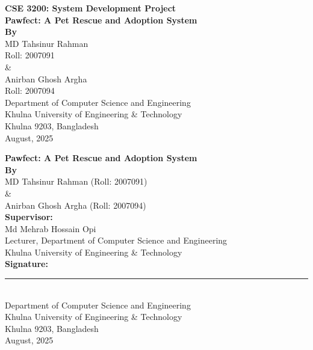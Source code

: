 \documentclass[12pt,a4paper]{report}
\numberwithin{figure}{chapter}
\numberwithin{table}{chapter}
\begin{document}
\begin{titlepage}
\begin{center}
\Large \textbf{CSE 3200: System Development Project}\\[16pt]

\LARGE \textbf{Pawfect: A Pet Rescue and Adoption System}\\[28pt]

\large \textbf{By}\\[6pt]
\large MD Tahsinur Rahman \\
\large Roll: 2007091\\[6pt]
\large \&\\[6pt]
\large Anirban Ghosh Argha \\
\large Roll: 2007094\\[18pt]

\large Department of Computer Science and Engineering\\
\large Khulna University of Engineering \& Technology\\[12pt]
\large Khulna 9203, Bangladesh\\[18pt]
\large August, 2025
\end{center}
\end{titlepage}

\begin{titlepage}
\begin{center}
\LARGE \textbf{Pawfect: A Pet Rescue and Adoption System}\\[20pt]
\large \textbf{By}\\[6pt]
\large MD Tahsinur Rahman (Roll: 2007091)\\
\large \&\\
\large Anirban Ghosh Argha (Roll: 2007094)\\[16pt]

\large \textbf{Supervisor:}\\[6pt]
\large Md Mehrab Hossain Opi\\
\large Lecturer, Department of Computer Science and Engineering\\
\large Khulna University of Engineering \& Technology\\[30pt]

\large \textbf{Signature:} \rule{6cm}{0.4pt}\\[28pt]

\large Department of Computer Science and Engineering\\
\large Khulna University of Engineering \& Technology\\[12pt]
\large Khulna 9203, Bangladesh\\[18pt]
\large August, 2025
\end{center}
\end{titlepage}
\end{document}
